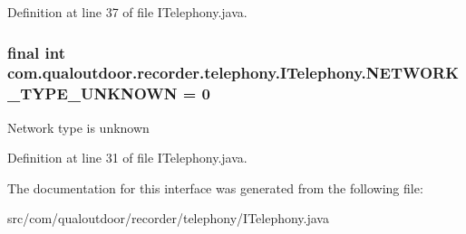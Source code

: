 Definition at line 37 of file I\-Telephony.\-java.

\hypertarget{interfacecom_1_1qualoutdoor_1_1recorder_1_1telephony_1_1ITelephony_a673927b5b9f59f4adfdbbe8403dc3f75}{
\subsubsection[{N\-E\-T\-W\-O\-R\-K\-\_\-\-T\-Y\-P\-E\-\_\-\-U\-N\-K\-N\-O\-W\-N}]{\setlength{\rightskip}{0pt plus 5cm}final int com.\-qualoutdoor.\-recorder.\-telephony.\-I\-Telephony.\-N\-E\-T\-W\-O\-R\-K\-\_\-\-T\-Y\-P\-E\-\_\-\-U\-N\-K\-N\-O\-W\-N = 0\hspace{0.3cm}{\ttfamily [static]}}}\label{interfacecom_1_1qualoutdoor_1_1recorder_1_1telephony_1_1ITelephony_a673927b5b9f59f4adfdbbe8403dc3f75}
Network type is unknown 

Definition at line 31 of file I\-Telephony.\-java.



The documentation for this interface was generated from the following file\-:\begin{DoxyCompactItemize}
\item 
src/com/qualoutdoor/recorder/telephony/I\-Telephony.\-java\end{DoxyCompactItemize}
